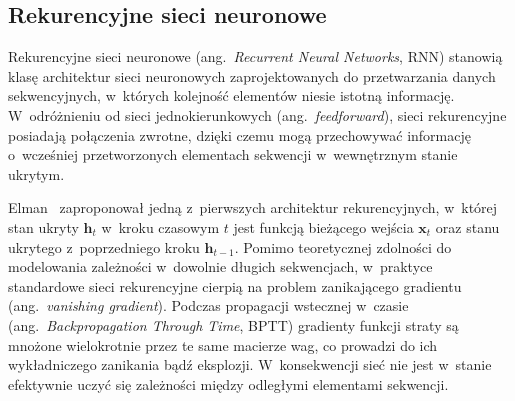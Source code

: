 \subsection{Rekurencyjne sieci neuronowe}
\label{sec:rnn}

Rekurencyjne sieci neuronowe (ang.~\textit{Recurrent Neural Networks}, RNN) stanowią klasę architektur sieci neuronowych zaprojektowanych do przetwarzania danych sekwencyjnych, w~których kolejność elementów niesie istotną informację. W~odróżnieniu od sieci jednokierunkowych (ang.~\textit{feedforward}), sieci rekurencyjne posiadają połączenia zwrotne, dzięki czemu mogą przechowywać informację o~wcześniej przetworzonych elementach sekwencji w~wewnętrznym stanie ukrytym.

Elman~\cite{elman1990rnn} zaproponował jedną z~pierwszych architektur rekurencyjnych, w~której stan ukryty $\mathbf{h}_t$ w~kroku czasowym $t$ jest funkcją bieżącego wejścia $\mathbf{x}_t$ oraz stanu ukrytego z~poprzedniego kroku $\mathbf{h}_{t-1}$. Pomimo teoretycznej zdolności do modelowania zależności w~dowolnie długich sekwencjach, w~praktyce standardowe sieci rekurencyjne cierpią na problem zanikającego gradientu (ang.~\textit{vanishing gradient}). Podczas propagacji wstecznej w~czasie (ang.~\textit{Backpropagation Through Time}, BPTT) gradienty funkcji straty są mnożone wielokrotnie przez te same macierze wag, co prowadzi do ich wykładniczego zanikania bądź eksplozji. W~konsekwencji sieć nie jest w~stanie efektywnie uczyć się zależności między odległymi elementami sekwencji.

